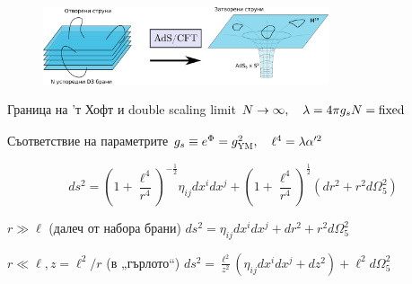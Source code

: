 \documentclass[bulg]{beamer}
\begin{document}
  \begin{frame}
    \footnotesize
  \begin{figure}
    \includegraphics[width=0.75\textwidth]{images/adscft.png}
  \end{figure}
  \vspace{-0.5cm}
\begin{minipage}[t]{0.45\linewidth}%
  \begin{alertblock}{\footnotesize Граница на 'т Хофт и double scaling limit}
$\strut N \rightarrow \infty,\quad \lambda = 4\pi g_s N = \text{fixed}$
\end{alertblock}
\end{minipage}%
\hspace{1.35cm}
\begin{minipage}[t]{0.45\linewidth}%
  \begin{alertblock}{\footnotesize Съответствие на параметрите}
    $ \strut g_s \equiv  e^{\Phi} = g^2_{\textsc{YM}},\quad \ell^4 = \lambda \alpha^{\prime 2}$
\end{alertblock}
\end{minipage}
\begin{equation*}
  ds^2 = \left(1+\frac{\ell^4}{r^4}\right)^{-\frac{1}{2}}\eta_{ij}dx^i dx^j
  + \left(1+\frac{\ell^4}{r^4}\right)^{\frac{1}{2}}\left(dr^2+r^2
  d\Omega^2_5\right)
\end{equation*}
\begin{minipage}[t]{0.45\linewidth}%
  \begin{alertblock}{\footnotesize $r\gg \ell$ (далеч от набора брани)}
    $ds^2 = \eta_{ij} dx^i dx^j + dr^2 +r^2 d\Omega_5^2$
\end{alertblock}
\end{minipage}%
\hspace{1.35cm}
\begin{minipage}[t]{0.45\linewidth}%
  \begin{alertblock}{\footnotesize $r\ll\ell, z=\ell^2/r$ (в „гърлото“)}
      $ds^2 = \frac{\ell^2}{z^2}(\eta_{ij} dx^i dx^j +dz^2) + \ell^2
      d\Omega_5^2$
\end{alertblock}
\end{minipage}
\end{frame}
\end{document}
